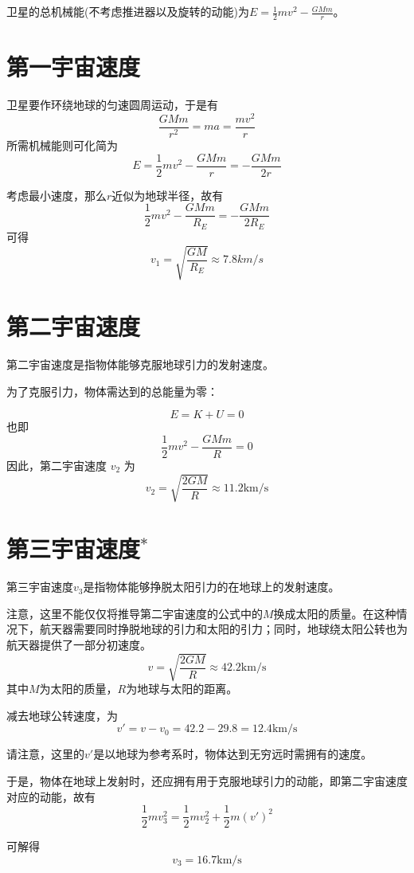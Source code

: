 \subsection[卫星运动]{}
卫星的总机械能(不考虑推进器以及旋转的动能)为$\displaystyle E=\frac{1}{2}mv^{2}-\frac{GMm}{r}$。

\section*{第一宇宙速度}
卫星要作环绕地球的匀速圆周运动，于是有
\[\frac{GMm}{r^{2}}=ma=\frac{mv^{2}}{r}\]
所需机械能则可化简为
\[E=\frac{1}{2}mv^{2}-\frac{GMm}{r}=-\frac{GMm}{2r}\]

考虑最小速度，那么$r$近似为地球半径，故有
\[\frac{1}{2}mv^{2}-\frac{GMm}{R_{E}}=-\frac{GMm}{2R_{E}}\]
可得
\[v_{1}=\sqrt{\frac{GM}{R_{E}}}\approx7.8km/s\]
\section*{第二宇宙速度}
第二宇宙速度是指物体能够克服地球引力的发射速度。

为了克服引力，物体需达到的总能量为零：

\[
    E = K + U = 0
\]
也即
\[
    \frac{1}{2}mv^2 - \frac{GMm}{R} = 0
\]
因此，第二宇宙速度 \( v_2 \) 为
\[
    v_2 = \sqrt{\frac{2GM}{R}}\approx11.2\mathrm{km/s}
\]

\section*{第三宇宙速度$^*$}
第三宇宙速度$v_3$是指物体能够挣脱太阳引力的在地球上的发射速度。

注意，这里不能仅仅将推导第二宇宙速度的公式中的$M$换成太阳的质量。在这种情况下，航天器需要同时挣脱地球的引力和太阳的引力；同时，地球绕太阳公转也为航天器提供了一部分初速度。
\[
    v = \sqrt{\frac{2GM}{R}}\approx42.2\mathrm{km/s}
\]
其中$M$为太阳的质量，$R$为地球与太阳的距离。

减去地球公转速度，为
\[v'=v-v_{0}=42.2-29.8=12.4\mathrm{km/s}\]

请注意，这里的$v'$是以地球为参考系时，物体达到无穷远时需拥有的速度。

于是，物体在地球上发射时，还应拥有用于克服地球引力的动能，即第二宇宙速度对应的动能，故有
\[\frac{1}{2}mv_{3}^{2}=\frac{1}{2}mv_{2}^{2}+\frac{1}{2}m(v')^{2}\]

可解得
\[v_{3}=16.7\mathrm{km/s}\]
